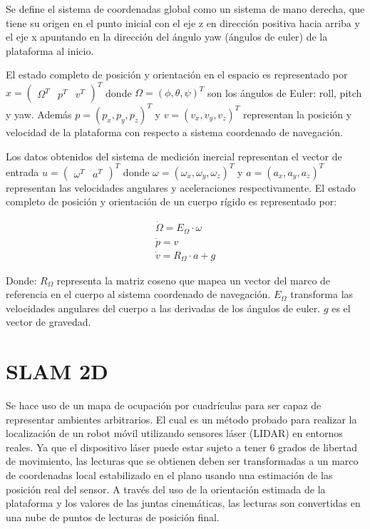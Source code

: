 \documentclass[10pt,a4paper]{article}
\begin{document}
Se define el sistema de coordenadas global como un sistema de mano derecha, que tiene su origen en el punto inicial con el eje z en dirección positiva hacia arriba y el eje x apuntando en la dirección del ángulo yaw (ángulos de euler) de la plataforma al inicio.

El estado completo de posición y orientación en el espacio es representado por
$x =
\begin{pmatrix}
	\Omega^{T} & p^{T} & v^{T}
\end{pmatrix}^{T}$
donde $\Omega = (\phi, \theta, \psi)^{T}$ son los ángulos de Euler: roll, pitch y yaw. Además $ p = (p_{x}, p_{y}, p_{z})^{T} $ y $ v = (v_{x}, v_{y}, v_{z})^{T} $ representan la posición y velocidad de la plataforma con respecto a sistema coordenado de navegación.

Los datos obtenidos del sistema de medición inercial representan el vector de entrada 
$u = 
\begin{pmatrix}
	\omega^{T} & a^{T}
\end{pmatrix}^{T}$
donde $ \omega = (\omega_{x}, \omega_{y}, \omega_{z})^{T} $ y $ a = (a_{x}, a_{y}, a_{z})^{T}  $ representan las velocidades angulares y aceleraciones respectivamente. El estado completo de posición y orientación de un cuerpo rígido es representado por:

\begin{gather}
\label{ec:epo}
\dot{\Omega} = E_{\Omega} \cdot \omega \\
\dot{p} = v \\
\dot{v} = R_{\Omega} \cdot a + g
\end{gather}

Donde: $ R_{\Omega} $ representa la matriz coseno que mapea un vector del marco de referencia en el cuerpo al sistema coordenado de navegación. $ E_{\Omega} $ transforma las velocidades angulares del cuerpo a las derivadas de los ángulos de euler. $ g $ es el vector de gravedad.

\section{SLAM 2D}

Se hace uso de un mapa de ocupación por cuadrículas para ser capaz de representar ambientes arbitrarios. El cual es un método probado para realizar la localización de un robot móvil utilizando sensores láser (LIDAR) en entornos reales. Ya que el dispositivo láser puede estar sujeto a tener 6 grados de libertad de movimiento, las lecturas que se obtienen deben ser transformadas a un marco de coordenadas local estabilizado en el plano usando una estimación de las posición real del sensor. A través del uso de la orientación estimada de la plataforma y los valores de las juntas cinemáticas, las lecturas son convertidas en una nube de puntos de lecturas de posición final.
\end{document}
